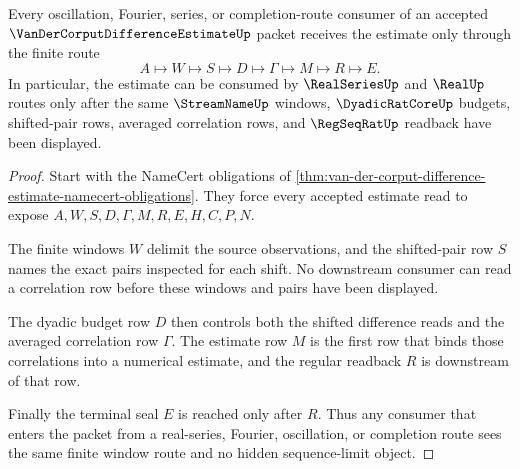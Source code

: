 \begin{theorem}
\label{thm:van-der-corput-difference-estimate-finite-window-route}
Every oscillation, Fourier, series, or completion-route consumer of an accepted $\VanDerCorputDifferenceEstimateUp$ packet receives the estimate only through the finite route
$$
A\longmapsto W\longmapsto S\longmapsto D\longmapsto \Gamma\longmapsto M\longmapsto R\longmapsto E .
$$
In particular, the estimate can be consumed by $\RealSeriesUp$ and $\RealUp$ routes only after the same $\StreamNameUp$ windows, $\DyadicRatCoreUp$ budgets, shifted-pair rows, averaged correlation rows, and $\RegSeqRatUp$ readback have been displayed.
\end{theorem}
\begin{proof}
Start with the NameCert obligations of \autoref{thm:van-der-corput-difference-estimate-namecert-obligations}. They force every accepted estimate read to expose $A,W,S,D,\Gamma,M,R,E,H,C,P,N$.

The finite windows $W$ delimit the source observations, and the shifted-pair row $S$ names the exact pairs inspected for each shift. No downstream consumer can read a correlation row before these windows and pairs have been displayed.

The dyadic budget row $D$ then controls both the shifted difference reads and the averaged correlation row $\Gamma$. The estimate row $M$ is the first row that binds those correlations into a numerical estimate, and the regular readback $R$ is downstream of that row.

Finally the terminal seal $E$ is reached only after $R$. Thus any consumer that enters the packet from a real-series, Fourier, oscillation, or completion route sees the same finite window route and no hidden sequence-limit object.
\end{proof}

